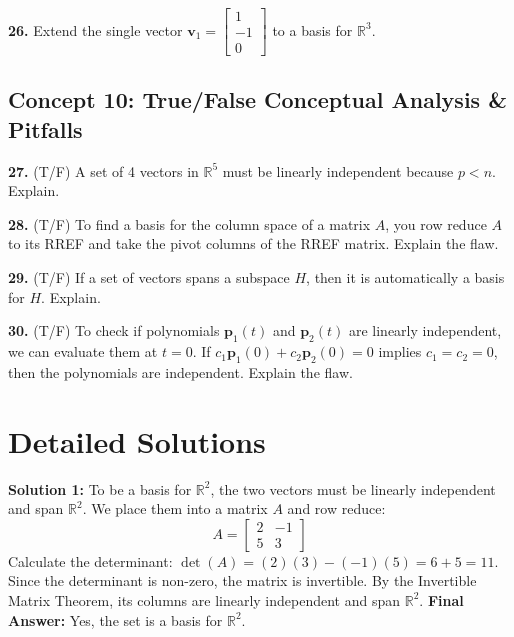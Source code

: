 \documentclass[11pt]{article}
\begin{document}
\vspace{0.5cm}
\textbf{26.} Extend the single vector $\mathbf{v}_1 = \begin{bmatrix} 1 \\ -1 \\ 0 \end{bmatrix}$ to a basis for $\mathbb{R}^3$.

\subsection*{Concept 10: True/False Conceptual Analysis \& Pitfalls}
\textbf{27.} (T/F) A set of 4 vectors in $\mathbb{R}^5$ must be linearly independent because $p < n$. Explain.

\vspace{0.5cm}
\textbf{28.} (T/F) To find a basis for the column space of a matrix $A$, you row reduce $A$ to its RREF and take the pivot columns of the RREF matrix. Explain the flaw.

\vspace{0.5cm}
\textbf{29.} (T/F) If a set of vectors spans a subspace $H$, then it is automatically a basis for $H$. Explain.

\vspace{0.5cm}
\textbf{30.} (T/F) To check if polynomials $\mathbf{p}_1(t)$ and $\mathbf{p}_2(t)$ are linearly independent, we can evaluate them at $t=0$. If $c_1\mathbf{p}_1(0) + c_2\mathbf{p}_2(0) = 0$ implies $c_1=c_2=0$, then the polynomials are independent. Explain the flaw.

\newpage

\section{Detailed Solutions}

\textbf{Solution 1:}
To be a basis for $\mathbb{R}^2$, the two vectors must be linearly independent and span $\mathbb{R}^2$. We place them into a matrix $A$ and row reduce:
$$ A = \begin{bmatrix} 2 & -1 \\ 5 & 3 \end{bmatrix} $$
Calculate the determinant: $\det(A) = (2)(3) - (-1)(5) = 6 + 5 = 11$. Since the determinant is non-zero, the matrix is invertible. By the Invertible Matrix Theorem, its columns are linearly independent and span $\mathbb{R}^2$. 
\textbf{Final Answer:} Yes, the set is a basis for $\mathbb{R}^2$.
\end{document}
